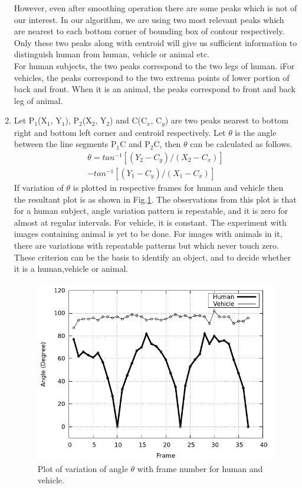 \documentclass[conference]{IEEEtran}
\begin{document}
\begin{enumerate}
\indent However, even after smoothing operation there are some peaks which is
not of our interest.  In our algorithm, we are using two most relevant
peaks which are nearest to each bottom corner of bounding box of contour
respectively.  Only these two peaks along with centroid will give us
sufficient information to distinguish human from human, vehicle or
animal etc. \\
\indent For human subjects, the two peaks correspond to
the two legs of human. iFor vehicles, the peaks
correspond to the two extrema points of lower portion of back and front.
When it is an animal, the peaks correspond to front and back leg of
animal.\\
\item Let P$_1$(X$_1$, Y$_1$), P$_2$(X$_2$, Y$_2$) and C(C$_x$, C$_y$)
are two peaks nearest to bottom right and bottom left corner and
centroid respectively. Let $\theta$ is the angle between the line
segments P$_1$C and P$_2$C, then $\theta$ can be calculated as
follows.\\
%
	\begin{equation}
	\begin{split}
	\theta = tan^{-1}[(Y_2 - C_y) / (X_2 - C_x)] \\
	 - tan^{-1}[(Y_1 - C_y) / (X_1 - C_x)]
	\end{split}
	\end{equation}
%
\indent If variation of $\theta$ is plotted in respective frames for
human and vehicle then the resultant plot is as shown in Fig.\ref{angle_plot}.
The observations from this plot is that for a  human
subject, angle variation pattern is repeatable, and it is zero for
almost at regular intervals.  For vehicle, it is constant. The
experiment with images containing animal is yet to be done. For images
with animals in it, there are variations with repeatable patterns but
which never touch zero.  These criterion can be the basis to identify an
object, and to decide whether it is a human,vehicle or animal.

\begin{figure}[!h]
\centering
\includegraphics[scale=0.35]{figures/angle_plot}
\caption{Plot of variation of angle $\theta$ with frame number for human and
vehicle.}
\label{angle_plot}
\end{figure}


\end{enumerate}
\end{document}
